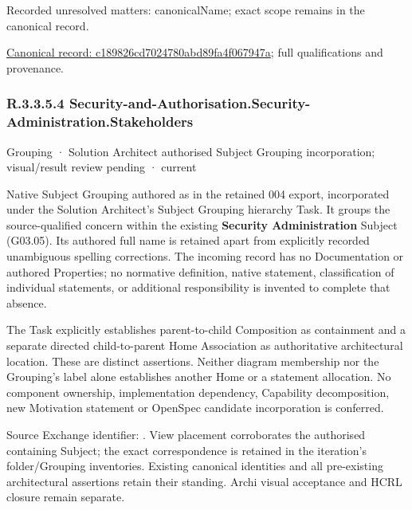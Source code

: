 {\small Recorded unresolved matters: canonicalName; exact scope remains in the canonical record.}\par
{\footnotesize \href{../../../../continuum/grouping/c189826cd7024780abd89fa4f067947a.md}{Canonical record: c189826cd7024780abd89fa4f067947a}; full qualifications and provenance.}\par
\subsubsection*{R.3.3.5.4 Security-and-Authorisation.Security-Administration.Stakeholders}
\label{navigation:R.3.3.5.4}

\label{element:980b414d73614bd48bc47a6aaa718a51}
{\small Grouping · Solution Architect authorised Subject Grouping incorporation; visual/result review pending · current}\par

Native Subject Grouping authored as \texttt{} in the retained 004 export,
incorporated under the Solution Architect's Subject Grouping hierarchy Task.
It groups the source-qualified \texttt{} concern within
the existing \textbf{Security Administration} Subject (G03.05). Its authored full name
is retained apart from explicitly recorded unambiguous spelling corrections.
The incoming record has no Documentation or authored Properties; no normative
definition, native statement, classification of individual statements, or
additional responsibility is invented to complete that absence.



The Task explicitly establishes parent-to-child Composition as containment and
a separate directed child-to-parent Home Association as authoritative architectural
location. These are distinct assertions. Neither diagram membership nor the
Grouping's label alone establishes another Home or a statement allocation.
No component ownership, implementation dependency, Capability decomposition,
new Motivation statement or OpenSpec candidate incorporation is conferred.



Source Exchange identifier: \texttt{}. View placement corroborates
the authorised containing Subject; the exact correspondence is retained in the
iteration's folder/Grouping inventories. Existing canonical identities and all
pre-existing architectural assertions retain their standing. Archi visual
acceptance and HCRL closure remain separate.


